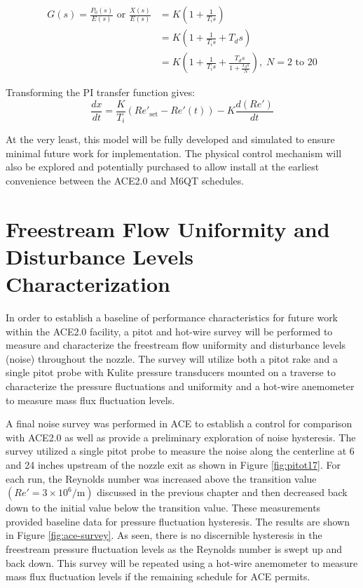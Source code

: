\vspace{-1.5cm}
\begin{subequations}
    \begin{align}
        G(s) = \frac{P_0(s)}{E(s)} \textrm{ or } \frac{X(s)}{E(s)} &= K \left(1 + \frac{1}{T_i s}\right) \label{eq:Re-PI}\\
                                 &= K \left(1 + \frac{1}{T_i s} + T_d s\right) \label{eq:Re-PID}\\
                                 &= K \left(1 + \frac{1}{T_i s} + \frac{T_d s}{1+\frac{T_d s}{N}}\right), \; N=2\textrm{ to }20 \label{eq:Re-PID-filter}
    \end{align}
\end{subequations}

Transforming the PI transfer function gives:
\begin{equation}
    \frac{dx}{dt} = \frac{K}{T_i} \left(Re'_{\mathrm{set}} - Re'(t)\right) - K \frac{d(Re')}{dt}
\end{equation}

At the very least, this model will be fully developed and simulated to ensure minimal future work for implementation. The physical control mechanism will also be explored and potentially purchased to allow install at the earliest convenience between the ACE2.0 and M6QT schedules.

\section{Freestream Flow Uniformity and Disturbance Levels Characterization}

In order to establish a baseline of performance characteristics for future work within the ACE2.0 facility, a pitot and hot-wire survey will be performed to measure and characterize the freestream flow uniformity and disturbance levels (noise) throughout the nozzle. The survey will utilize both a pitot rake and a single pitot probe with Kulite pressure transducers mounted on a traverse to characterize the pressure fluctuations and uniformity and a hot-wire anemometer to measure mass flux fluctuation levels.

A final noise survey was performed in ACE to establish a control for comparison with ACE2.0 as well as provide a preliminary exploration of noise hysteresis. The survey utilized a single pitot probe to measure the noise along the centerline at 6 and 24 inches upstream of the nozzle exit as shown in Figure \ref{fig:pitot17}. For each run, the Reynolds number was increased above the transition value $\left(Re' = 3 \times 10^6/\mathrm{m}\right)$ discussed in the previous chapter and then decreased back down to the initial value below the transition value. These measurements provided baseline data for pressure fluctuation hysteresis. The results are shown in Figure \ref{fig:ace-survey}. As seen, there is no discernible hysteresis in the freestream pressure fluctuation levels as the Reynolds number is swept up and back down. This survey will be repeated using a hot-wire anemometer to measure mass flux fluctuation levels if the remaining schedule for ACE permits.

